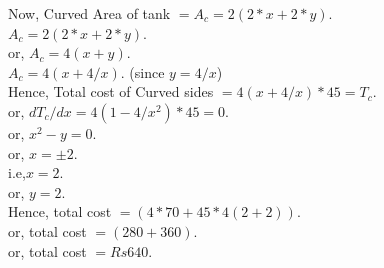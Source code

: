 \documentclass[tikz,border=2pt,png]{article}
\begin{document}
\begin{itemize}
Now, Curved Area of tank $=A_c=2(2*x+2*y)$.\\

 \hspace{0.8 cm}$A_c=2(2*x+2*y)$.\\

or, \hspace{0.8 cm}$A_c=4(x+y)$.\\

\hspace{0.8 cm}$A_c=4(x+4/x)$. \hspace{3 cm}(since $y=4/x$)\\

Hence, Total cost of Curved sides $=4(x+4/x)*45=T_c$.\\

or, \hspace{0.8 cm}$dT_c/dx=4(1-4/x^2)*45=0$.\\

or, \hspace{0.8 cm}$x^2-y=0$.\\

or, \hspace{0.8 cm}$x=\pm2$.\\

i.e,\hspace{0.8 cm}$x=2$.\\

or, \hspace{0.8 cm}$y=2$.\\

Hence, total cost $=(4*70+45*4(2+2))$.\\

or, \hspace{0.8 cm}total cost $=(280+360)$.\\
 
or, \hspace{0.8 cm}total cost $=Rs  640$.\\
\end{itemize}
\end{document}
